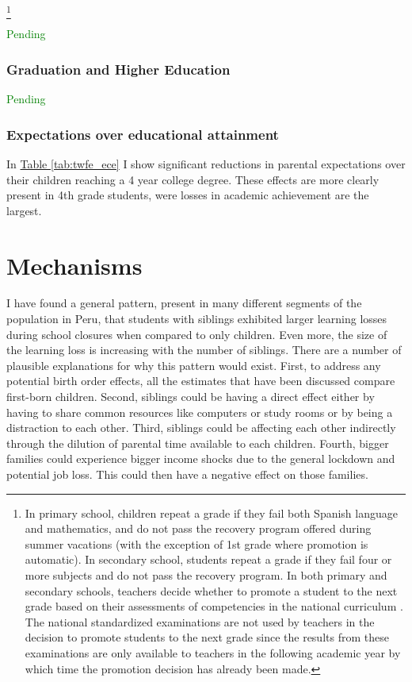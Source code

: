\footnote{In primary school, children repeat a grade if they fail both Spanish language and mathematics, and do not pass the recovery program offered during summer vacations (with the exception of 1st grade where promotion is automatic). In secondary school, students repeat a grade if they fail four or more subjects and do not pass the recovery program. In both primary and secondary schools, teachers decide whether to promote a student to the next grade based on their assessments of competencies in the national curriculum \citep{minedu_rm_2005}. The national standardized examinations are not used by teachers in the decision to promote students to the next grade since the results from these examinations are only available to teachers in the following academic year by which time the promotion decision has already been made.}

\textcolor{green}{Pending}

\subsubsection{Graduation and Higher Education}

\textcolor{green}{Pending}

\subsubsection{Expectations over educational attainment}

In \hyperref[tab:twfe_ece]{Table \ref{tab:twfe_ece}}
I show significant reductions in parental expectations over their children reaching a 4 year college degree. These effects are more clearly present in 4th grade students, were losses in academic achievement are the largest.

\section{Mechanisms}\label{sec:mechanisms}

I have found a general pattern, present in many different segments of the population in Peru, that students with siblings exhibited larger learning losses during school closures when compared to only children. Even more, the size of the learning loss is increasing with the number of siblings. There are a number of plausible explanations for why this pattern would exist. First, to address any potential birth order effects, all the estimates that have been discussed compare first-born children. Second, siblings could be having a direct effect either by having to share common resources like computers or study rooms or by being a distraction to each other. Third, siblings could be affecting each other indirectly through the dilution of parental time available to each children. Fourth, bigger families could experience bigger income shocks due to the general lockdown and potential job loss. This could then have a negative effect on those families.


